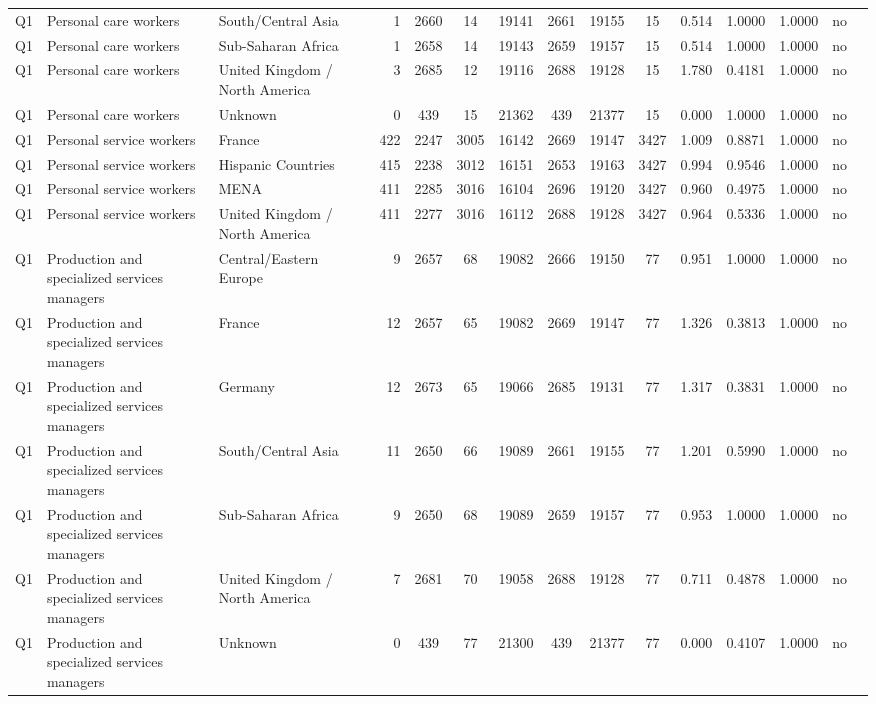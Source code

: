 \begin{longtable}{lllrcccccccccll}
Q1 & Personal care workers & South/Central Asia & 1 & 2660 & 14 & 19141 & 2661 & 19155 & 15 & 0.514 & 1.0000 & 1.0000 & no \\
Q1 & Personal care workers & Sub-Saharan Africa & 1 & 2658 & 14 & 19143 & 2659 & 19157 & 15 & 0.514 & 1.0000 & 1.0000 & no \\
Q1 & Personal care workers & United Kingdom / North America & 3 & 2685 & 12 & 19116 & 2688 & 19128 & 15 & 1.780 & 0.4181 & 1.0000 & no \\
Q1 & Personal care workers & Unknown & 0 & 439 & 15 & 21362 & 439 & 21377 & 15 & 0.000 & 1.0000 & 1.0000 & no \\
Q1 & Personal service workers & France & 422 & 2247 & 3005 & 16142 & 2669 & 19147 & 3427 & 1.009 & 0.8871 & 1.0000 & no \\
Q1 & Personal service workers & Hispanic Countries & 415 & 2238 & 3012 & 16151 & 2653 & 19163 & 3427 & 0.994 & 0.9546 & 1.0000 & no \\
Q1 & Personal service workers & MENA & 411 & 2285 & 3016 & 16104 & 2696 & 19120 & 3427 & 0.960 & 0.4975 & 1.0000 & no \\
Q1 & Personal service workers & United Kingdom / North America & 411 & 2277 & 3016 & 16112 & 2688 & 19128 & 3427 & 0.964 & 0.5336 & 1.0000 & no \\
Q1 & Production and specialized services managers & Central/Eastern Europe & 9 & 2657 & 68 & 19082 & 2666 & 19150 & 77 & 0.951 & 1.0000 & 1.0000 & no \\
Q1 & Production and specialized services managers & France & 12 & 2657 & 65 & 19082 & 2669 & 19147 & 77 & 1.326 & 0.3813 & 1.0000 & no \\
Q1 & Production and specialized services managers & Germany & 12 & 2673 & 65 & 19066 & 2685 & 19131 & 77 & 1.317 & 0.3831 & 1.0000 & no \\
Q1 & Production and specialized services managers & South/Central Asia & 11 & 2650 & 66 & 19089 & 2661 & 19155 & 77 & 1.201 & 0.5990 & 1.0000 & no \\
Q1 & Production and specialized services managers & Sub-Saharan Africa & 9 & 2650 & 68 & 19089 & 2659 & 19157 & 77 & 0.953 & 1.0000 & 1.0000 & no \\
Q1 & Production and specialized services managers & United Kingdom / North America & 7 & 2681 & 70 & 19058 & 2688 & 19128 & 77 & 0.711 & 0.4878 & 1.0000 & no \\
Q1 & Production and specialized services managers & Unknown & 0 & 439 & 77 & 21300 & 439 & 21377 & 77 & 0.000 & 0.4107 & 1.0000 & no \\

\end{longtable}

